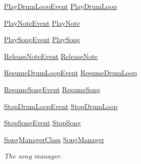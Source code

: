 \begin{DoxyCompactItemize}
\hyperlink{group___v_i_m_event_types_class_virtual_instrument_manager_1_1_play_drum_loop_event}{Play\+Drum\+Loop\+Event} \hyperlink{group___v_i_m_events_ga5657ff4bcc7de6d240d7092ffd22a6fe}{Play\+Drum\+Loop}
\item 
\hyperlink{group___v_i_m_event_types_class_virtual_instrument_manager_1_1_play_note_event}{Play\+Note\+Event} \hyperlink{group___v_i_m_events_gaa21021c13a8c9d13cbf374d5bf9d68fa}{Play\+Note}
\item 
\hyperlink{group___v_i_m_event_types_class_virtual_instrument_manager_1_1_play_song_event}{Play\+Song\+Event} \hyperlink{group___v_i_m_events_gae450bdba9c513ab4e43f69def50fa84d}{Play\+Song}
\item 
\hyperlink{group___v_i_m_event_types_class_virtual_instrument_manager_1_1_release_note_event}{Release\+Note\+Event} \hyperlink{group___v_i_m_events_ga3a1726a6366126421434c2c7be5e5678}{Release\+Note}
\item 
\hyperlink{group___v_i_m_event_types_class_virtual_instrument_manager_1_1_resume_drum_loop_event}{Resume\+Drum\+Loop\+Event} \hyperlink{group___v_i_m_events_ga54db2dc24076cd3cd130e95c2fd5bea0}{Resume\+Drum\+Loop}
\item 
\hyperlink{group___v_i_m_event_types_class_virtual_instrument_manager_1_1_resume_song_event}{Resume\+Song\+Event} \hyperlink{group___v_i_m_events_ga01670916ae3917c84a0fb51667f30ab9}{Resume\+Song}
\item 
\hyperlink{group___v_i_m_event_types_class_virtual_instrument_manager_1_1_stop_drum_loop_event}{Stop\+Drum\+Loop\+Event} \hyperlink{group___v_i_m_events_ga9466995fd3b4a07351a8577042ee8b31}{Stop\+Drum\+Loop}
\item 
\hyperlink{group___v_i_m_event_types_class_virtual_instrument_manager_1_1_stop_song_event}{Stop\+Song\+Event} \hyperlink{group___v_i_m_events_gaa9e464629814abf2e4db88e240fac72c}{Stop\+Song}
\item 
\hyperlink{class_song_manager_class}{Song\+Manager\+Class} \hyperlink{group___v_i_m_pub_ga33dae94932c10c66db76a0eebec76b01}{Song\+Manager}
\begin{DoxyCompactList}\small\item\em The song manager. \end{DoxyCompactList}\end{DoxyCompactItemize}
